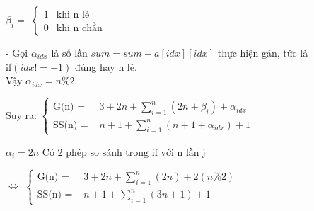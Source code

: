 \documentclass{article}
\newcommand\tab[1][1cm]{\hspace*{#1}}
\begin{document}
\vspace{5mm}
\tab $\beta_{i} = $
\(
\begin{cases}
    1 & \text{khi n lẻ}\\
    0 & \text{khi n chẳn}
\end{cases}\)

\vspace{5mm}
- Gọi $\alpha_{idx}$ là số lần $ sum = sum - a[idx][idx] $ 
thực hiện gán, tức là\\  if$(idx != -1)$ đúng hay n lẻ.\\
\tab Vậy $\alpha_{idx} = n \% 2 $ 

\vspace{5mm}
\tab Suy ra:  
\(
\begin{cases}
    \text{G(n) = } &  3 + 2n + \sum\limits_{i=1}^{n}{(2n + \beta_{i})}  + \alpha_{idx} \\

    \text{SS(n) = } &  n + 1  + \sum\limits_{i=1}^{n}{(n +  1 + \alpha_{idx})}  + 1
\end{cases}
\)

\vspace{5mm}
\( \alpha_{i} = 2n \text{ Có 2 phép so sánh trong if với n lần j}\)

\vspace{5mm}
\tab \tab  $\Leftrightarrow $
\(
\begin{cases}
    \text{G(n) = } &  3 + 2n + \sum\limits_{i=1}^{n}{(2n)}  + 2(n\%2) \\

    \text{SS(n) = } &  n + 1  + \sum\limits_{i=1}^{n}{(3n +  1)}  + 1
\end{cases}
\)
\end{document}
